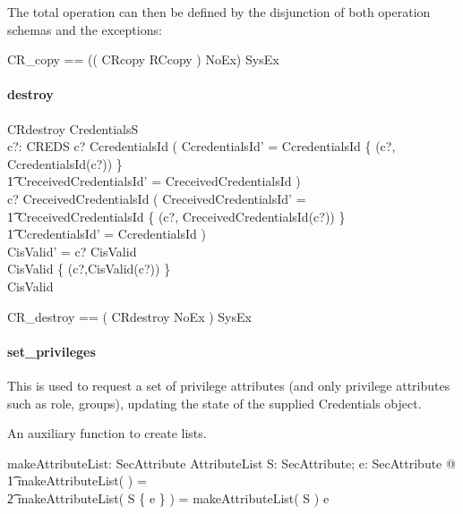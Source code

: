 The total operation can then be defined by the disjunction of both operation
schemas and the exceptions:
\begin{zed}
  CR\_copy == (( CRcopy \lor RCcopy ) \land NoEx) \lor SysEx
\end{zed}


\paragraph{destroy}
\begin{schema}{CRdestroy}
  \Delta CredentialsS \\
  c?: CREDS
  \where
  c? \in \dom CcredentialsId \implies ( CcredentialsId' = CcredentialsId \setminus \{ (c?,
  CcredentialsId(c?)) \} \\
  \t1 \land CreceivedCredentialsId' = CreceivedCredentialsId ) \\
  c? \in \dom CreceivedCredentialsId \implies ( CreceivedCredentialsId' = \\
  \t1 CreceivedCredentialsId \setminus \{ (c?, CreceivedCredentialsId(c?)) \} \\
  \t1 \land CcredentialsId' = CcredentialsId ) \\ 
  CisValid' = \< \IF c? \in \dom CisValid \\
  \THEN CisValid \setminus \{ (c?,CisValid(c?)) \} \\
  \ELSE CisValid \>
\end{schema}
\begin{zed}
  CR\_destroy == ( CRdestroy \land NoEx ) \lor SysEx \\
\end{zed}


\paragraph{set\_privileges}
This is used to request a set of privilege attributes (and only privilege
attributes such as role, groups), updating the state of the supplied Credentials
object.

An auxiliary function to create lists.
\begin{axdef}
  makeAttributeList: \power SecAttribute \fun AttributeList
  \where
  \forall S: \power SecAttribute; e: SecAttribute @ \\
  \t1 makeAttributeList( \emptyset ) = \langle \rangle \land \\
  \t2 makeAttributeList( S \cup \{ e \} ) = makeAttributeList( S ) \cat \langle
  e \rangle \\ 
\end{axdef}

